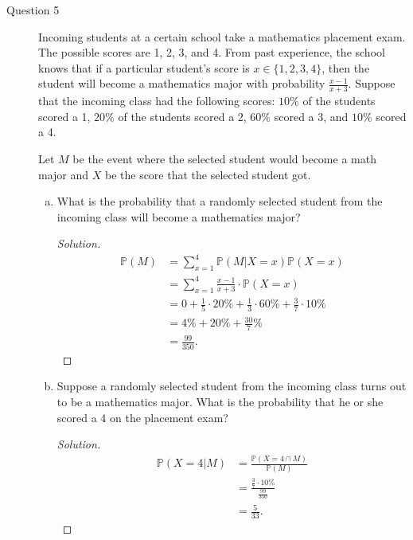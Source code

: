 \documentclass[addpoints, 11pt]{exam}
\newcommand*{\prob}{\mathds{P}}
\begin{document}
\begin{description}
\newpage

    \item[Question 5] Incoming students at a certain school take a mathematics placement exam. The possible scores are 1, 2, 3, and 4. From past experience, the school knows that if a particular student’s score is $x \in \{1, 2, 3, 4\}$, then the student will become a mathematics major with probability $\frac{x-1}{x+3}$. Suppose that the incoming class had the following scores: $10\%$ of the students scored a 1, $20\%$ of the students scored a 2, $60\%$ scored a 3, and $10\%$ scored a 4.

    Let $M$ be the event where the selected student would become a math major and $X$ be the score that the selected student got.

    \begin{enumerate}[(a)]
        \item What is the probability that a randomly selected student from the incoming class will become a mathematics major?

        \begin{proof}[Solution]
            \begin{align}
                \prob(M) 
                &= \sum_{x = 1}^4 \prob(M | X = x)\prob(X = x) \\
                &= \sum_{x = 1}^4 \frac{x-1}{x+3} \cdot \prob(X = x) \\
                &= 0 + \frac{1}{5} \cdot 20\% + \frac{1}{3} \cdot 60\% + \frac{3}{7} \cdot 10\% \\
                &= 4\% + 20\% + \frac{30}{7}\% \\
                &= \frac{99}{350}.
            \end{align}
        \end{proof}

        \item Suppose a randomly selected student from the incoming class turns out to be a mathematics major. What is the probability that he or she scored a 4 on the placement exam?

        \begin{proof}[Solution]
            \begin{align}
                \prob(X = 4 | M) 
                &= \frac{\prob(X = 4 \cap M)}{\prob(M)} \\
                &= \frac{\frac{3}{7} \cdot 10\%}{\frac{99}{350}} \\
                &= \frac{5}{33}.
            \end{align}
        \end{proof}
    \end{enumerate}


\end{description}
\end{document}
